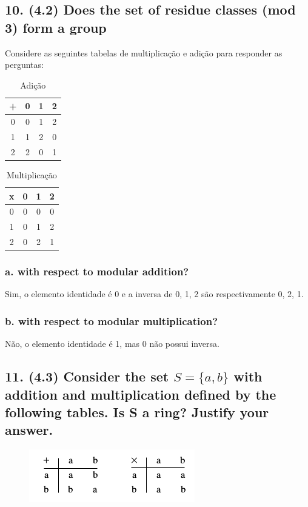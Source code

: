 \documentclass[fleqn, 12pt]{article}
\begin{document}
\subsection*{10. (4.2) Does the set of residue classes (mod 3) form a group}

    Considere as seguintes tabelas de multiplicação e adição para responder as
    perguntas:

    \begin{table}[h]
      \centering
      \caption{Adição}
      \begin{tabular}{|c|c|c|c|}
      \hline
      + & 0 & 1 & 2  \\ \hline
      0 & 0 & 1 & 2  \\ \hline
      1 & 1 & 2 & 0  \\ \hline
      2 & 2 & 0 & 1  \\ \hline
      \end{tabular}
    \end{table}

    \begin{table}[h]
      \centering
      \caption{Multiplicação}
      \begin{tabular}{|c|c|c|c|}
      \hline
      x & 0 & 1 & 2  \\ \hline
      0 & 0 & 0 & 0  \\ \hline
      1 & 0 & 1 & 2  \\ \hline
      2 & 0 & 2 & 1  \\ \hline
      \end{tabular}
    \end{table}

  \subsubsection*{a. with respect to modular addition?}

    Sim, o elemento identidade é 0 e a inversa de 0, 1, 2 são respectivamente 0,
    2, 1.

  \subsubsection*{b. with respect to modular multiplication?}

    Não, o elemento identidade é 1, mas 0 não possui inversa.

\subsection*{11. (4.3) Consider the set $S = \lbrace a, b \rbrace$ with addition
and multiplication defined by the following tables. Is S a ring? Justify your
answer.}
  \begin{figure}[h]
    \centering
    \includegraphics{quatro_tres}
  \end{figure}
\end{document}
